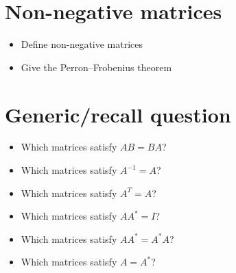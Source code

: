 \documentclass[a4paper]{article}
\begin{document}
\section{Non-negative matrices}

\begin{itemize}
  \item Define non-negative matrices
  \item Give the Perron--Frobenius theorem
\end{itemize}

\section{Generic/recall question}

\begin{itemize}
  \item Which matrices satisfy $A B = B A$?
  \item Which matrices satisfy $A^{-1} = A$?
  \item Which matrices satisfy $A^{T} = A$?
  \item Which matrices satisfy $AA^* = I$?
  \item Which matrices satisfy $AA^* = A^*A$?
  \item Which matrices satisfy $A = A^*$?
\end{itemize}
\end{document}

